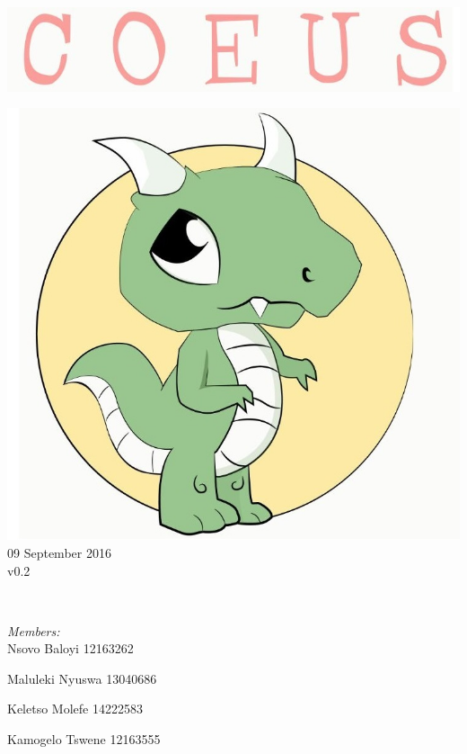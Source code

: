 \documentclass[a4paper,12pt]{article}
\begin{document}
\begin{titlepage}
	\includegraphics[width=\textwidth]{name} \\[1cm]
	\begin{minipage}{0.4\textwidth}
	\begin{flushleft} \large
	\includegraphics[width=\textwidth]{logo} \\[0.5cm]
	{\large 09 September 2016}\\
	{\large v0.2}
	\end{flushleft}
	\end{minipage}
	~
	\begin{minipage}{0.5\textwidth}
	\begin{flushright} \large
	\emph{Members:}\\%
	Nsovo Baloyi 12163262

	Maluleki Nyuswa 13040686
	
	Keletso Molefe 14222583
	
	Kamogelo Tswene 12163555

	\end{flushright}
	\end{minipage}\\[4cm]
\end{titlepage}
\end{document}

